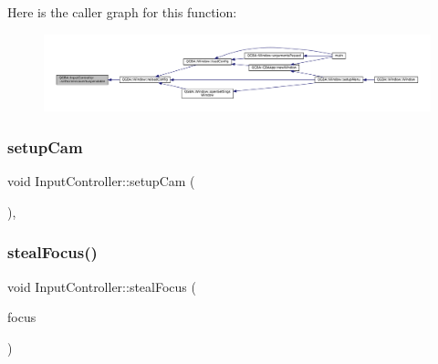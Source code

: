 Here is the caller graph for this function\+:
\nopagebreak
\begin{figure}[H]
\begin{center}
\leavevmode
\includegraphics[width=350pt]{class_q_g_b_a_1_1_input_controller_aa09db1d4f2f488a78dfc27899d087094_icgraph}
\end{center}
\end{figure}
\mbox{\label{class_q_g_b_a_1_1_input_controller_a90831694883462971f12d75ce3bfdc30}} 
\subsubsection{\texorpdfstring{setup\+Cam}{setupCam}}
{\footnotesize\ttfamily void Input\+Controller\+::setup\+Cam (\begin{DoxyParamCaption}{ }\end{DoxyParamCaption})\hspace{0.3cm}{\ttfamily [private]}, {\ttfamily [slot]}}

\mbox{\label{class_q_g_b_a_1_1_input_controller_a353b5eb540cb42cca70e50adb41db9f1}} 
\subsubsection{\texorpdfstring{steal\+Focus()}{stealFocus()}}
{\footnotesize\ttfamily void Input\+Controller\+::steal\+Focus (\begin{DoxyParamCaption}\item[{Q\+Widget $\ast$}]{focus }\end{DoxyParamCaption})}


